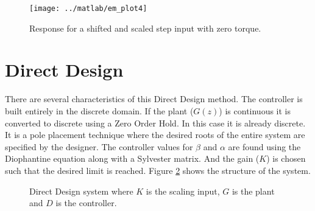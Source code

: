 \documentclass{article}
\begin{document}
\begin{figure}[htbp!]
\begin{center}
\texttt{[image: ../matlab/em\_plot4]}
\end{center}
\caption{Response for a shifted and scaled step input with zero torque.}
\label{fig:em_plot4}
\end{figure}


\clearpage

\section{Direct Design}

There are several characteristics of this Direct Design method.
The controller is built entirely in the discrete domain.
If the plant ($G(z)$) is continuous it is converted to discrete
using a Zero Order Hold.
In this case it is already discrete.
It is a pole placement technique where the desired roots of the
entire system are specified by the designer.
The controller values for $\beta$ and $\alpha$ are found using the
Diophantine equation along with a Sylvester matrix.
And the gain ($K$) is chosen such that the desired limit is reached.
Figure \ref{fig:ddc} shows the structure of the system.

\begin{figure}[h!]

\begin{center}
\end{center}

\caption{Direct Design system where $K$ is the scaling input, $G$ is
the plant and $D$ is the controller.}
\label{fig:ddc}
\end{figure}
\end{document}
